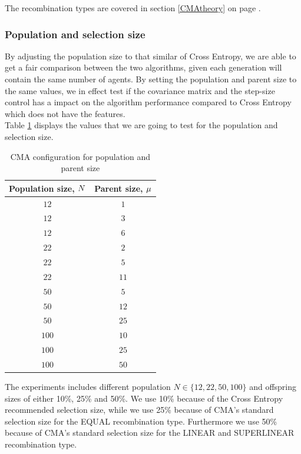 The recombination types are covered in section \ref{CMAtheory} on 
page \pageref{eq:recomType}.


\subsubsection{Population and selection size}
By adjusting the population size to that similar of Cross Entropy, we are able
to get a fair comparison between the two algorithms, given each generation will
contain the same number of agents. By setting the population and parent size
to the same values, we in effect test if the covariance matrix and the step-size
control has a impact on the algorithm performance compared to Cross Entropy
which does not have the features.\\
Table \ref{CMAPopulationSelectionConfigTest} displays the values that we are going
to test for the population and selection size.

\begin{table}[h]
\centering
\begin{tabular}{c c}
Population size, $N$ & Parent size, $\mu$\\
\hline
$12$ & $1$\\
$12$ & $3$\\
$12$ & $6$\\
$22$ & $2$\\
$22$ & $5$\\
$22$ & $11$\\
$50$ & $5$\\
$50$ & $12$\\
$50$ & $25$\\
$100$ & $10$\\
$100$ & $25$\\
$100$ & $50$
\end{tabular}
\caption{CMA configuration for population and parent size \label{CMAPopulationSelectionConfigTest}}
\end{table}

The experiments includes different population $N \in \{12,22,50,100\}$ and offspring sizes of either
10\%, 25\% and 50\%. We use 10\% because of the Cross Entropy recommended selection size, while
we use 25\% because of CMA's standard selection size for the EQUAL recombination type. 
Furthermore we use 50\% because of CMA's standard selection size for the LINEAR and SUPERLINEAR 
recombination type.

